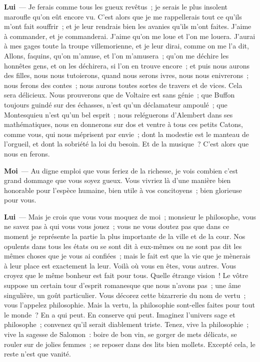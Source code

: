 \documentclass[french,twoside]{book} %
\newcommand{\labelchar}[1]{\textbf{\color{rubric} #1}}
\begin{document}
\labelchar{Lui} — Je ferais comme tous les gueux revêtus ; je serais le plus insolent maroufle qu’on eût encore vu. C’est alors que je me rappellerais tout ce qu’ils m’ont fait souffrir ; et je leur rendrais bien les avanies qu’ils m’ont faites. J’aime à commander, et je commanderai. J’aime qu’on me loue et l’on me louera. J’aurai à mes gages toute la troupe villemorienne, et je leur dirai, comme on me l’a dit, Allons, faquins, qu’on m’amuse, et l’on m’amusera ; qu’on me déchire les honnêtes gens, et on les déchirera, si l’on en trouve encore ; et puis nous aurons des filles, nous nous tutoierons, quand nous serons ivres, nous nous enivrerons ; nous ferons des contes ; nous aurons toutes sortes de travers et de vices. Cela sera délicieux. Nous prouverons que de Voltaire est sans génie ; que Buffon toujours guindé sur des échasses, n’est qu’un déclamateur ampoulé ; que Montesquieu n’est qu’un bel esprit ; nous reléguerons d’Alembert dans ses mathématiques, nous en donnerons sur dos et ventre à tous ces petits Catons, comme vous, qui nous méprisent par envie ; dont la modestie est le manteau de l’orgueil, et dont la sobriété la loi du besoin. Et de la musique ? C’est alors que nous en ferons.\par
\labelchar{Moi} — Au digne emploi que vous feriez de la richesse, je vois combien c’est grand dommage que vous soyez gueux. Vous vivriez là d’une manière bien honorable pour l’espèce humaine, bien utile à vos concitoyens ; bien glorieuse pour vous.\par
\labelchar{Lui} — Mais je crois que vous vous moquez de moi ; monsieur le philosophe, vous ne savez pas à qui vous vous jouez ; vous ne vous doutez pas que dans ce moment je représente la partie la plus importante de la ville et de la cour. Nos opulents dans tous les états ou se sont dit à eux-mêmes ou ne sont pas dit les mêmes choses que je vous ai confiées ; mais le fait est que la vie que je mènerais à leur place est exactement la leur. Voilà où vous en êtes, vous autres. Vous croyez que le même bonheur est fait pour tous. Quelle étrange vision ! Le vôtre suppose un certain tour d’esprit romanesque que nous n’avons pas ; une âme singulière, un goût particulier. Vous décorez cette bizarrerie du nom de vertu ; vous l’appelez philosophie. Mais la vertu, la philosophie sont-elles faites pour tout le monde ? En a qui peut. En conserve qui peut. Imaginez l’univers sage et philosophe ; convenez qu’il serait diablement triste. Tenez, vive la philosophie ; vive la sagesse de Salomon : boire de bon vin, se gorger de mets délicats, se rouler sur de jolies femmes ; se reposer dans des lits bien mollets. Excepté cela, le reste n’est que vanité.\par
\end{document}
